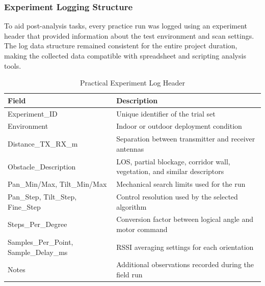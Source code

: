 \subsubsection{Experiment Logging Structure}

To aid post-analysis tasks, every practice run was logged using an experiment header that provided information about the test environment and scan settings. The log data structure remained consistent for the entire project duration, making the collected data compatible with spreadsheet and scripting analysis tools.

\vspace{0.5cm}
\begin{table}[H]
\centering
\caption{Practical Experiment Log Header}
\label{tab:experiment_log_header}
\renewcommand{\arraystretch}{1.3}
\begin{tabular}{|
>{\raggedright\arraybackslash}p{3.8cm}|
>{\raggedright\arraybackslash}p{9.4cm}|
}
\hline
\textbf{Field} & \textbf{Description} \\
\hline
Experiment\_ID & Unique identifier of the trial set \\
\hline
Environment & Indoor or outdoor deployment condition \\
\hline
Distance\_TX\_RX\_m & Separation between transmitter and receiver antennas \\
\hline
Obstacle\_Description & LOS, partial blockage, corridor wall, vegetation, and similar descriptors \\
\hline
Pan\_Min/Max, Tilt\_Min/Max & Mechanical search limits used for the run \\
\hline
Pan\_Step, Tilt\_Step, Fine\_Step & Control resolution used by the selected algorithm \\
\hline
Steps\_Per\_Degree & Conversion factor between logical angle and motor command \\
\hline
Samples\_Per\_Point, Sample\_Delay\_ms & RSSI averaging settings for each orientation \\
\hline
Notes & Additional observations recorded during the field run \\
\hline
\end{tabular}
\end{table}
